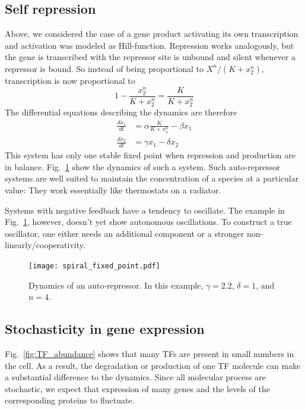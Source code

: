\subsection*{Self repression}
Above, we considered the case of a gene product activating its own transcription and activation was modeled as Hill-function.
Repression works analogously, but the gene is transcribed with the repressor site is unbound and silent whenever a repressor is bound.
So instead of being proportional to $X^n/(K+x_2^n)$, transcription is now proportional to
\begin{equation}
	1-\frac{x_2^n}{K+x_2^n}=\frac{K}{K+x_2^n}
\end{equation}
The differential equations describing the dynamics are therefore
\begin{eqnarray}
	\label{eq:repressor}
	\frac{dx_1}{dt} &= \alpha\frac{K}{K+x_2^n} - \beta x_1 \\
	\frac{dx_2}{dt} &= \gamma x_1 - \delta x_2
\end{eqnarray}
This system has only one stable fixed point when repression and production are in balance.
Fig.~\ref{fig:repressor} show the dynamics of such a system.
Such auto-repressor systems are well suited to maintain the concentration of a species at a particular value: They work essentially like thermostats on a radiator.

Systems with negative feedback have a tendency to oscillate.
The example in Fig.~\ref{fig:repressor}, however, doesn't yet show autonomous oscillations.
To construct a true oscillator, one either needs an additional component or a stronger non-linearly/cooperativity.

\begin{figure}[tb]
	\centering
	\texttt{[image: spiral\_fixed\_point.pdf]}
	\caption{Dynamics of an auto-repressor. In this example, $\gamma=2.2$, $\delta=1$, and $n=4$.}
	\label{fig:repressor}
\end{figure}

\subsection*{Stochasticity in gene expression}
Fig.~\ref{fig:TF_abundance} shows that many TFs are present in small numbers in the cell.
As a result, the degradation or production of one TF molecule can make a substantial difference to the dynamics.
Since all molecular process are stochastic, we expect that expression of many genes and the levels of the corresponding proteins to fluctuate.

